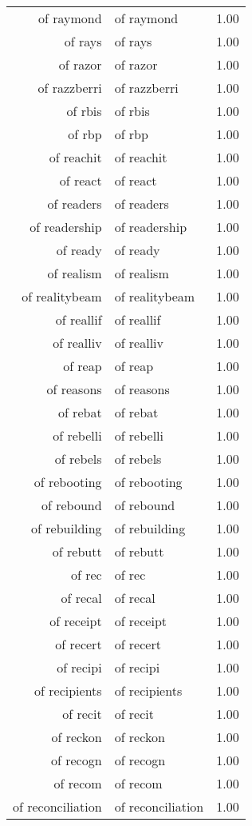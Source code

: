 \begin{table}[ht]
\begin{tabular}{rlr}
  of raymond & of raymond & 1.00 \\ 
  of rays & of rays & 1.00 \\ 
  of razor & of razor & 1.00 \\ 
  of razzberri & of razzberri & 1.00 \\ 
  of rbis & of rbis & 1.00 \\ 
  of rbp & of rbp & 1.00 \\ 
  of reachit & of reachit & 1.00 \\ 
  of react & of react & 1.00 \\ 
  of readers & of readers & 1.00 \\ 
  of readership & of readership & 1.00 \\ 
  of ready & of ready & 1.00 \\ 
  of realism & of realism & 1.00 \\ 
  of realitybeam & of realitybeam & 1.00 \\ 
  of reallif & of reallif & 1.00 \\ 
  of realliv & of realliv & 1.00 \\ 
  of reap & of reap & 1.00 \\ 
  of reasons & of reasons & 1.00 \\ 
  of rebat & of rebat & 1.00 \\ 
  of rebelli & of rebelli & 1.00 \\ 
  of rebels & of rebels & 1.00 \\ 
  of rebooting & of rebooting & 1.00 \\ 
  of rebound & of rebound & 1.00 \\ 
  of rebuilding & of rebuilding & 1.00 \\ 
  of rebutt & of rebutt & 1.00 \\ 
  of rec & of rec & 1.00 \\ 
  of recal & of recal & 1.00 \\ 
  of receipt & of receipt & 1.00 \\ 
  of recert & of recert & 1.00 \\ 
  of recipi & of recipi & 1.00 \\ 
  of recipients & of recipients & 1.00 \\ 
  of recit & of recit & 1.00 \\ 
  of reckon & of reckon & 1.00 \\ 
  of recogn & of recogn & 1.00 \\ 
  of recom & of recom & 1.00 \\ 
  of reconciliation & of reconciliation & 1.00 \\ 

\end{tabular}
\end{table}
